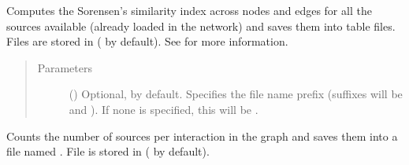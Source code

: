 \documentclass[letterpaper,10pt,english]{sphinxmanual}
\begin{document}
\begin{fulllineitems}

\begin{fulllineitems}
\label{\detokenize{main:pypath.main.PyPath.source_similarity}}
Computes the Sorensen’s similarity index across nodes and edges
for all the sources available (already loaded in the network)
and saves them into table files. Files are stored in
 ( by default).
See {\hyperref[\detokenize{main:pypath.main.PyPath.databases_similarity}]{}} for more
information.
\begin{quote}\begin{description}
\item[{Parameters}] \leavevmode
{} () \textendash{} Optional,  by default. Specifies the file name
prefix (suffixes will be  and ). If
none is specified, this will be
.

\end{description}\end{quote}

\end{fulllineitems}


\begin{fulllineitems}
\label{\detokenize{main:pypath.main.PyPath.source_stats}}
\end{fulllineitems}


\begin{fulllineitems}
\label{\detokenize{main:pypath.main.PyPath.sources_hist}}
Counts the number of sources per interaction in the graph and
saves them into a file named . File is stored in
 ( by
default).


\end{fulllineitems}
\end{fulllineitems}
\end{document}

